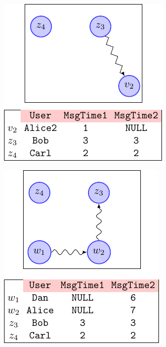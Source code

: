 \begin{figure}[!ph]
\begin{minipage}[b]{.35\linewidth}
		\label{fig:disj_both}
	\end{minipage}
	\begin{minipage}[b]{.3\linewidth}
		\centering
		\includegraphics[scale=0.8]{fig/03joins/diff_left}
		\label{fig:diff_left}
	\end{minipage}
	\begin{minipage}[b]{.3\linewidth}
		\centering
		\includegraphics[scale=0.8]{fig/03joins/diff_right}
		\label{fig:diff_right}
	\end{minipage}
	\begin{minipage}[b]{.35\linewidth}
		\centering

\end{minipage}
\end{figure}
